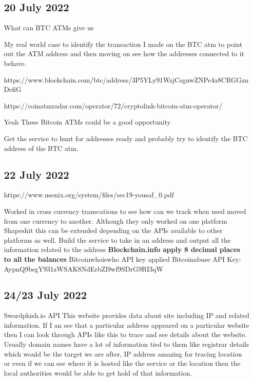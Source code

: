 \documentclass{article}
\begin{document}
    
    \subsection{20 July 2022}

        What can BTC ATMs give us
        
        My real world case to identify the transaction I made on the BTC atm to point out the ATM address and then moving on see how the addresses connected to it behave.
        
        https://www.blockchain.com/btc/address/3P5YLy91WzjCsgnwZNPe4a8CRGGznDefiG
        
        https://coinatmradar.com/operator/72/cryptolink-bitcoin-atm-operator/
        
        Yeah These Bitcoin ATMs could be a good opportunity
        
        Get the service to hunt for addresses ready and probably try to identify the BTC address of the BTC atm. 
        
    \subsection{22 July 2022}
        https://www.usenix.org/system/files/sec19-yousaf_0.pdf
        
        Worked in cross currency transcations to see how can we track when used moved from one currency to another. Although they only worked on one platform Shapeshit this can be extended depending on the APIs available to other platforms as well. 
        Build the service to take in an address and output all the information related to the address
        \textbf{Blockchain.info apply 8 decimal places to all the balances}
        Bitcoinwhoiswho API key applied
        Bitcoinabuse API Key: AypnQ9bsgY931zWSAK8NdErbZl9wf9SDrG9RI3qW
        
        
    \subsection{24/23 July 2022}
        Swordphish.io API This website provides data about site including IP and related information. If I an see that a particular address appeared on a particular website then I can look through APIs like this to trace and see details about the website. Usually domain names have a lot of information tied to them like registrar details which would be the target we are after, IP address amazing for tracing location or even if we can see where it is hosted like the service or the location then the local authorities would be able to get hold of that information. 
         
\end{document}
